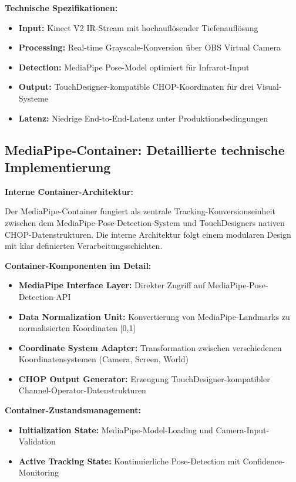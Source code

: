 \textbf{Technische Spezifikationen:}
\begin{itemize}
    \item \textbf{Input:} Kinect V2 IR-Stream mit hochauflösender Tiefenauflösung
    \item \textbf{Processing:} Real-time Grayscale-Konversion über OBS Virtual Camera
    \item \textbf{Detection:} MediaPipe Pose-Model optimiert für Infrarot-Input
    \item \textbf{Output:} TouchDesigner-kompatible CHOP-Koordinaten für drei Visual-Systeme
    \item \textbf{Latenz:} Niedrige End-to-End-Latenz unter Produktionsbedingungen
\end{itemize}

\subsection{MediaPipe-Container: Detaillierte technische Implementierung}

\textbf{Interne Container-Architektur:}

\raggedright Der MediaPipe-Container fungiert als zentrale Tracking-Konversionseinheit zwischen dem MediaPipe-Pose-Detection-System und TouchDesigners nativen CHOP-Datenstrukturen. Die interne Architektur folgt einem modularen Design mit klar definierten Verarbeitungsschichten.

\textbf{Container-Komponenten im Detail:}
\begin{itemize}
    \item \textbf{MediaPipe Interface Layer:} Direkter Zugriff auf MediaPipe-Pose-Detection-API
    \item \textbf{Data Normalization Unit:} Konvertierung von MediaPipe-Landmarks zu normalisierten Koordinaten [0,1]
    \item \textbf{Coordinate System Adapter:} Transformation zwischen verschiedenen Koordinatensystemen (Camera, Screen, World)
    \item \textbf{CHOP Output Generator:} Erzeugung TouchDesigner-kompatibler Channel-Operator-Datenstrukturen
\end{itemize}

\textbf{Container-Zustandsmanagement:}
\begin{itemize}
    \item \textbf{Initialization State:} MediaPipe-Model-Loading und Camera-Input-Validation
    \item \textbf{Active Tracking State:} Kontinuierliche Pose-Detection mit Confidence-Monitoring
\end{itemize}

